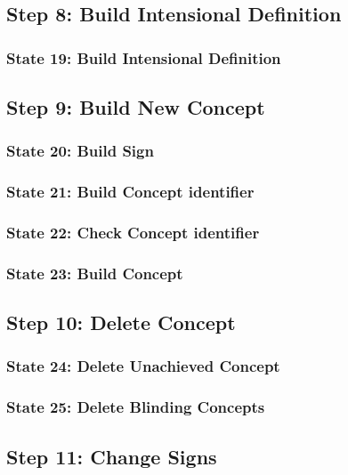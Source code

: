 \subsection{Step 8: Build Intensional Definition}

\subsubsection{State 19: Build Intensional Definition}

\subsection{Step 9: Build New Concept}

\subsubsection{State 20: Build Sign}

\subsubsection{State 21: Build Concept identifier}

\subsubsection{State 22: Check Concept identifier}

\subsubsection{State 23: Build Concept}

\subsection{Step 10: Delete Concept}

\subsubsection{State 24: Delete Unachieved Concept}

\subsubsection{State 25: Delete Blinding Concepts}

\subsection{Step 11: Change Signs}

